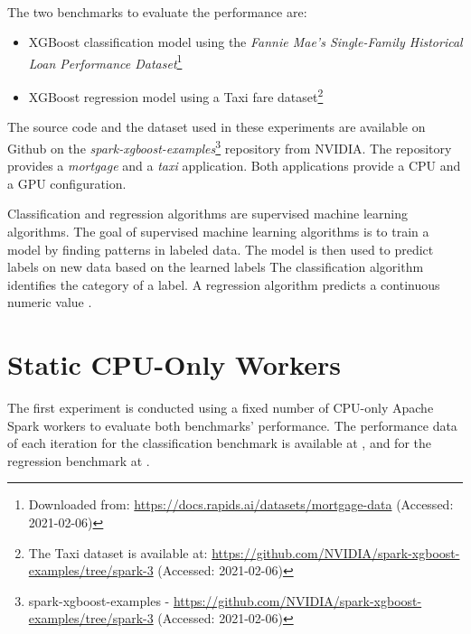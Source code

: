 \paragraph{}
The two benchmarks to evaluate the performance are:
\begin{itemize}
\item XGBoost classification model using the \textit{Fannie Mae's Single-Family Historical Loan Performance Dataset}\footnote{Downloaded from: \url{https://docs.rapids.ai/datasets/mortgage-data} (Accessed: 2021-02-06)}\cite{Fannie2021Mortgage}

\item XGBoost regression model using a Taxi fare dataset\footnote{The Taxi dataset is available at: \url{https://github.com/NVIDIA/spark-xgboost-examples/tree/spark-3} (Accessed: 2021-02-06)}
\end{itemize}
The source code and the dataset used in these experiments are available on Github on the \textit{spark-xgboost-examples}\footnote{spark-xgboost-examples - \url{https://github.com/NVIDIA/spark-xgboost-examples/tree/spark-3} (Accessed: 2021-02-06)} repository from NVIDIA.
The repository provides a \textit{mortgage} and a \textit{taxi} application. Both applications provide a CPU and a GPU configuration.

Classification and regression algorithms are supervised machine learning algorithms.
The goal of supervised machine learning algorithms is to train a model by finding patterns in labeled data. The model is then used to predict labels on new data based on the learned labels
The classification algorithm identifies the category of a label.
A regression algorithm predicts a continuous numeric value \cite{Mcdonald2020SparkRapids}.


\section{Static CPU-Only Workers}
\label{sec:07_static}
The first experiment is conducted using a fixed number of CPU-only Apache Spark workers to evaluate both benchmarks' performance.
The performance data of each iteration for the classification benchmark is available at , and for the regression benchmark at .


